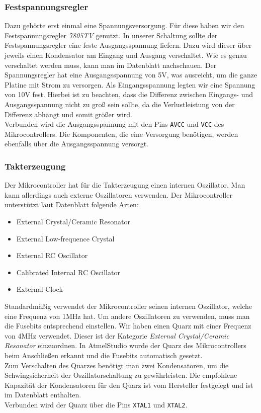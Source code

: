 \documentclass[]{article}
\begin{document}
\subsubsection{Festspannungsregler}
Dazu gehörte erst einmal eine Spannungsversorgung. Für diese haben wir den Festspannungsregler \textit{7805TV} genutzt. 
In unserer Schaltung sollte der Festspannungsregler eine feste Ausgangsspannung liefern. Dazu wird dieser über jeweils einen Kondensator am Eingang und Ausgang verschaltet. Wie es genau verschaltet werden muss, kann man im Datenblatt nachschauen. 
Der Spannungsregler hat eine Ausgangsspannung von 5V, was ausreicht, um die ganze Platine mit Strom zu versorgen. Als Eingangsspannung legten wir eine Spannung von 10V fest. Hierbei ist zu beachten, dass die Differenz zwischen Eingangs- und Ausgangsspannung nicht zu groß sein sollte, da die Verlustleistung von der Differenz abhängt und somit größer wird.
\\Verbunden wird die Ausgangsspannung mit den Pins \texttt{AVCC} und \texttt{VCC} des Mikrocontrollers. Die Komponenten, die eine Versorgung benötigen, werden ebenfalls über die Ausgangsspannung versorgt.

\subsubsection{Takterzeugung}
Der Mikrocontroller hat für die Takterzeugung einen internen Oszillator. Man kann allerdings auch externe Oszillatoren verwenden. Der Mikrocontroller unterstützt laut Datenblatt folgende Arten: 
\begin{itemize}
\item External Crystal/Ceramic Resonator
\item External Low-frequence Crystal 
\item External RC Oscillator 
\item Calibrated Internal RC Oscillator
\item External Clock
\end{itemize}
Standardmäßig verwendet der Mikrocontroller seinen internen Oszillator, welche eine Frequenz von 1MHz hat. Um andere Oszillatoren zu verwenden, muss man die Fusebits entsprechend einstellen. Wir haben einen Quarz mit einer Frequenz von 4MHz verwendet. Dieser ist der Kategorie \textit{External Crystal/Ceramic Resonator} einzuordnen. In AtmelStudio wurde der Quarz des Mikrocontrollers beim Anschließen erkannt und die Fusebits automatisch gesetzt. 
\\Zum Verschalten des Quarzes benötigt man zwei Kondensatoren, um die Schwingsicherheit der Oszillatorschaltung zu gewährleisten. Die empfohlene Kapazität der Kondensatoren für den Quarz ist vom Hersteller festgelegt und ist im Datenblatt enthalten.
\\Verbunden wird der Quarz über die Pins \texttt{XTAL1} und \texttt{XTAL2}.
\end{document}
